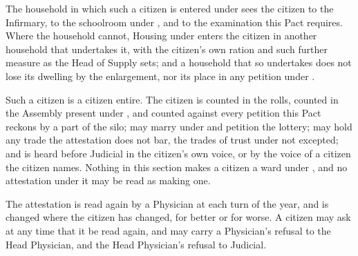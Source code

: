 \begin{clauses}
\item The household in which such a citizen is entered under  sees the citizen to the Infirmary, to the schoolroom under , and to the examination this Pact requires. Where the household cannot, Housing under  enters the citizen in another household that undertakes it, with the citizen's own ration and such further measure as the Head of Supply sets; and a household that so undertakes does not lose its dwelling by the enlargement, nor its place in any petition under .
\item Such a citizen is a citizen entire. The citizen is counted in the rolls, counted in the Assembly present under , and counted against every petition this Pact reckons by a part of the silo; may marry under  and petition the lottery; may hold any trade the attestation does not bar, the trades of trust under  not excepted; and is heard before Judicial in the citizen's own voice, or by the voice of a citizen the citizen names. Nothing in this section makes a citizen a ward under , and no attestation under it may be read as making one.
\item The attestation is read again by a Physician at each turn of the year, and is changed where the citizen has changed, for better or for worse. A citizen may ask at any time that it be read again, and may carry a Physician's refusal to the Head Physician, and the Head Physician's refusal to Judicial.
\end{clauses}
